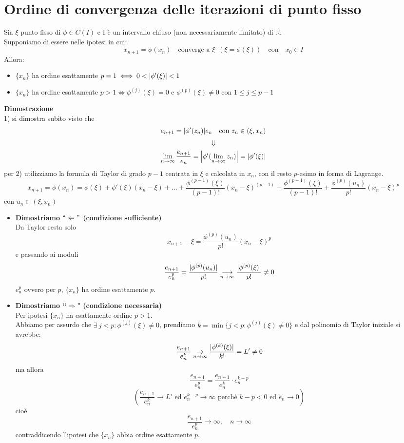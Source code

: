 \section{Ordine di convergenza delle iterazioni di punto fisso}
Sia $\xi$ punto fisso di $\phi \in C(I)$  e I è un intervallo chiuso (non necessariamente limitato) di $\mathbb{R}$.\\ 
Supponiamo di essere nelle ipotesi in cui:
\begin{equation*}
x_{n+1} = \phi(x_n) \quad \text{converge a } \xi \,\,\,(\xi=\phi(\xi)) \quad \text{con} \quad x_0\in I
\end{equation*}
Allora:
\begin{itemize}
	\item $\{x_n\}$ ha ordine esattamente $p=1 \iff 0<\abs*{\phi'(\xi)}<1$ 
	\item $\{x_n\}$ ha ordine esattamente $p>1 \iff \phi^{(j)}(\xi)=0$ e $\phi^{(p)}(\xi)\ne0$ con $1\le j\le p-1$ 
\end{itemize}
\textbf{Dimostrazione}\\
1) si dimostra subito visto che
\[e_{n+1}={\abs*{\phi'(z_n)}}e_n \quad \text{con} \,\, z_n\in(\xi,x_n)\]
\[\Downarrow\]
\[\lim_{n \to \infty} \frac{e_{n+1}}{e_n} = \abs*{\phi'(\lim_{n \to \infty }z_n)} = \abs*{\phi'(\xi)}\]
per 2) utilizziamo la formula di Taylor di grado $p-1$ centrata in $\xi$ e calcolata in $x_n$, con il resto $p$-esimo in forma di Lagrange.
\[
x_{n+1}=\phi(x_n)=\phi(\xi)+\phi'(\xi)(x_n-\xi)+\dots+\frac{\phi^{(p-1)}(\xi)}{(p-1)!}(x_n-\xi)^{(p-1)}+\frac{\phi^{(p-1)}(\xi)}{(p-1)!}+\frac{\phi^{(p)}(u_n)}{p!}(x_n-\xi)^p
\]
con $u_n \in (\xi,x_n)$\\
\begin{itemize}
	\item \textbf{Dimostriamo $``\Leftarrow"$ (condizione sufficiente)}\\
	Da Taylor resta solo
	\[x_{n+1}-\xi=\frac{\phi^{(p)}(u_n)}{p!}(x_n-\xi)^p\]
	e passando ai moduli
	\[\frac{e_{n+1}}{e_n^p}=\frac{\abs{\phi^{(p)}(u_n)}}{p!}\underset{n\to\infty}{\longrightarrow}\frac{\abs{\phi^{(p)}(\xi)}}{p!}\neq 0\]
	$e_n^p$ ovvero per $p$, $\{x_n\}$ ha ordine esattamente $p$. \\
	\item \textbf{Dimostriamo ``$\Rightarrow$" (condizione necessaria)}\\ 
	Per ipotesi $\{ x_n \}$ ha esattamente ordine $p>1$.\\
	Abbiamo per assurdo che $\exists\ j<p :\phi^{(j)}(\xi)\neq 0 $, prendiamo $k=\min\{ j<p:\phi^{(j)}(\xi)\neq0\}$ e dal polinomio di Taylor iniziale si avrebbe:
	\[\frac{e_{n+1}}{e_n^k}\underset{n\to \infty}{\to} \frac{\abs{\phi^{(k)}(\xi)}}{k!}=L'\neq 0\] 
	ma allora
	\[\frac{e_{n+1}}{e_n^p} = \frac{e_{n+1}}{e_n^k}\cdot e_n^{k-p}\]
	\[\left( \frac{e_{n+1}}{e_n^k} \to L' \text{ ed } e_n^{k-p} \to \infty \text{ perchè } k-p<0 \text{ ed } e_n \to 0 \right) \]
	cioè 
	\[\frac{e_{n+1}}{e_n^p} \to \infty, \quad n \to \infty\]
	contraddicendo l'ipotesi che $\{x_n\}$ abbia ordine esattamente $p$.
\end{itemize}
